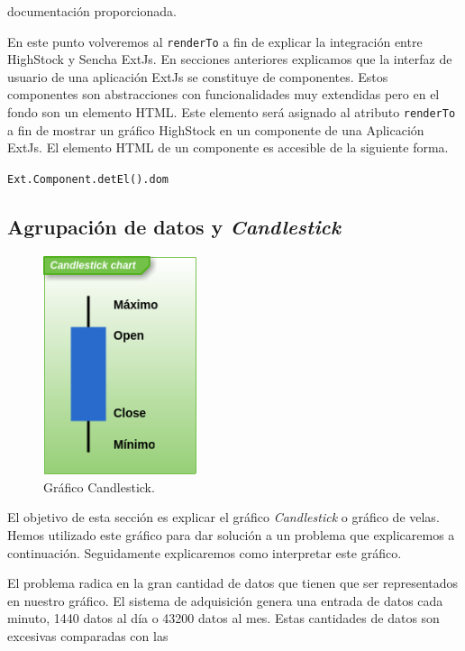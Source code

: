 	documentación proporcionada\cite{HighStockDoc}.
	\par
	En este punto volveremos al \texttt{renderTo} a fin de explicar la integración entre HighStock y Sencha ExtJs. En secciones anteriores
	explicamos que la interfaz de usuario de una aplicación ExtJs se constituye de componentes. Estos componentes son abstracciones con
	funcionalidades muy extendidas pero en el fondo son un elemento HTML. Este elemento será asignado al atributo \texttt{renderTo} a fin de
	mostrar un gráfico HighStock en un componente de una Aplicación ExtJs. El elemento HTML de un componente es accesible de la siguiente forma.
    		\begin{center} \texttt{Ext.Component.detEl().dom}  \end{center}
	\subsection{Agrupación de datos y \emph{Candlestick}} 
		\begin{figure}
			\centering
	        	\includegraphics[keepaspectratio, width=0.40\textwidth]{./img/candlestick.png}
			\caption{Gráfico Candlestick.}
			\label{fig:candlestick}
		\end{figure}
		El objetivo de esta sección es explicar el gráfico \emph{Candlestick} o gráfico de velas. Hemos utilizado este gráfico para dar
		solución a un problema que explicaremos a continuación. Seguidamente explicaremos como interpretar este gráfico.
		\par
		El problema radica en la gran cantidad de datos que tienen que ser representados en nuestro gráfico. El sistema de adquisición genera
		una entrada de datos cada minuto, 1440 datos al día o 43200 datos al mes. Estas cantidades de datos son excesivas comparadas con las
